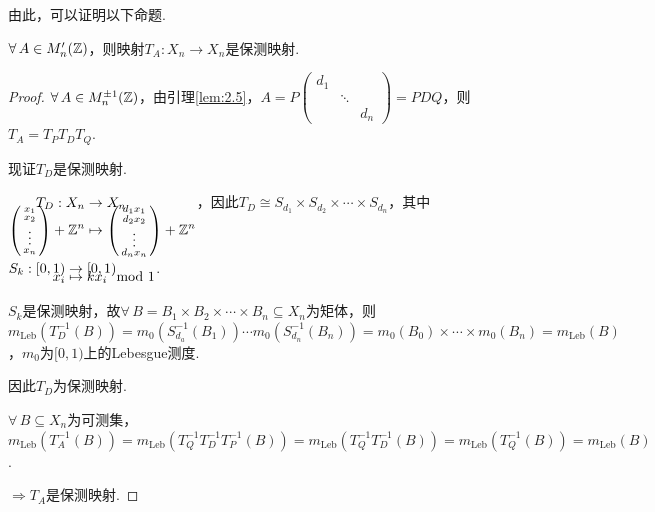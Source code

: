 由此，可以证明以下命题.
\begin{proposition}
    $\forall\,A\in M'_n(\mathbb{Z})$，则映射$T_A:X_n\to X_n$是保测映射.
\end{proposition}
\begin{proof}
    $\forall\,A\in M^{\pm 1}_n(\mathbb{Z})$，由引理\ref{lem:2.5}，$A=P\left(\begin{smallmatrix}
        d_1 & & \\
        & \ddots & \\
        & & d_n
    \end{smallmatrix}\right)=PDQ$，则$T_A=T_PT_DT_Q$.\par
    现证$T_D$是保测映射.\par
    $\setjot[-6]\begin{aligned}[t]
        T_D:X_n &\to X_n \\
        \left(\begin{smallmatrix}
            x_1 \\ x_2 \\\vdots \\x_n
        \end{smallmatrix}\right)+\mb{Z}^n &\mapsto \left(\begin{smallmatrix}
        d_1 x_1 \\ d_2 x_2 \\\vdots \\d_n x_n
    \end{smallmatrix}\right)+\mb{Z}^n
    \end{aligned}$，因此$T_D\cong S_{d_1}\times S_{d_2}\times\cdots\times S_{d_n}$，其中$\setjot[-6]\begin{aligned}[t]
        S_{k}:[0,1) &\to [0,1) \\
        x_i &\mapsto kx_i \mod 1
    \end{aligned}$.\par
    $S_k$是保测映射，故$\forall\, B=B_1\times B_2\times \cdots\times B_n\subseteq X_n$为矩体，则$m_\mathrm{Leb}\left(T^{-1}_D(B)\right)=m_0 \left(S^{-1}_{d_a}(B_1)\right)\cdots m_0 \left(S^{-1}_{d_n}(B_n)\right)=m_0(B_0)\times\cdots\times m_0(B_n)=m_\mathrm{Leb}(B)$，$m_0$为$[0,1)$上的Lebesgue测度. \par
    因此$T_D$为保测映射.\par
    $\forall\, B\subseteq X_n$为可测集，$m_\mathrm{Leb} \left(T^{-1}_A(B)\right)=m_\mathrm{Leb}(T^{-1}_Q T^{-1}_D T^{-1}_P(B))=m_\mathrm{Leb}(T^{-1}_Q T^{-1}_D (B))=m_\mathrm{Leb}(T^{-1}_Q(B))=m_\mathrm{Leb}(B)$.\par
    $\Rightarrow T_A$是保测映射.
\end{proof}

